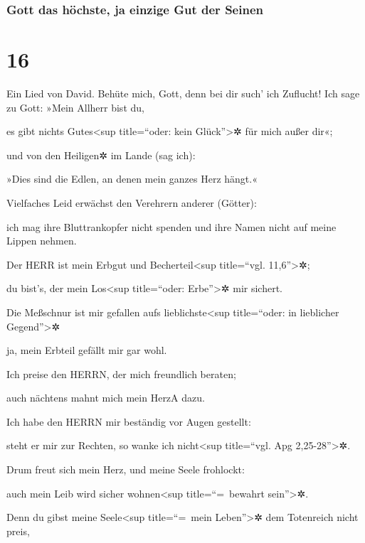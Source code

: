 \hypertarget{gott-das-huxf6chste-ja-einzige-gut-der-seinen}{%
\subsubsection{Gott das höchste, ja einzige Gut der
Seinen}\label{gott-das-huxf6chste-ja-einzige-gut-der-seinen}}

\hypertarget{section-15}{%
\section{16}\label{section-15}}

Ein Lied von David. Behüte mich, Gott, denn bei dir such'
ich Zuflucht! Ich sage zu Gott: »Mein Allherr bist du,

es gibt nichts Gutes\textless sup title=``oder: kein
Glück''\textgreater✲ für mich außer dir«;

und von den Heiligen✲ im Lande (sag ich):

»Dies sind die Edlen, an denen mein ganzes Herz hängt.«

Vielfaches Leid erwächst den Verehrern anderer (Götter):

ich mag ihre Bluttrankopfer nicht spenden und ihre Namen nicht auf meine
Lippen nehmen.

Der HERR ist mein Erbgut und Becherteil\textless sup
title=``vgl. 11,6''\textgreater✲;

du bist's, der mein Los\textless sup title=``oder: Erbe''\textgreater✲
mir sichert.

Die Meßschnur ist mir gefallen aufs
lieblichste\textless sup title=``oder: in lieblicher
Gegend''\textgreater✲

ja, mein Erbteil gefällt mir gar wohl.

Ich preise den HERRN, der mich freundlich beraten;

auch nächtens mahnt mich mein Herz{A} dazu.

Ich habe den HERRN mir beständig vor Augen gestellt:

steht er mir zur Rechten, so wanke ich nicht\textless sup title=``vgl.
Apg 2,25-28''\textgreater✲.

Drum freut sich mein Herz, und meine Seele frohlockt:

auch mein Leib wird sicher wohnen\textless sup title=``=~bewahrt
sein''\textgreater✲.

Denn du gibst meine Seele\textless sup title=``=~mein
Leben''\textgreater✲ dem Totenreich nicht preis,

